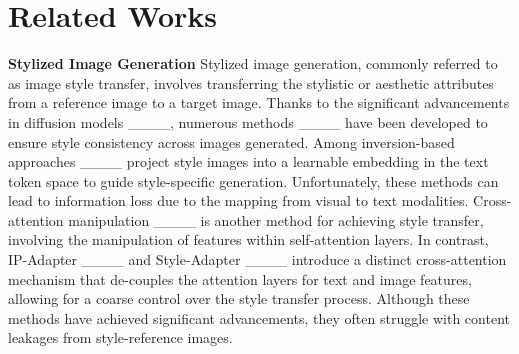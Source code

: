 \section{Related Works}
\textbf{Stylized Image Generation}
Stylized image generation, commonly referred to as image style transfer, involves transferring the stylistic or aesthetic attributes from a reference image to a target image. 
Thanks to the significant advancements in diffusion models ____,
numerous methods ____ have been developed to ensure style consistency across images generated. Among inversion-based approaches ____ project style images into a learnable embedding in the text token space to guide style-specific generation. Unfortunately, these methods can lead to information loss due to the mapping from visual to text modalities.
Cross-attention manipulation ____ is another method for achieving style transfer, involving the manipulation of features within self-attention layers. 
In contrast, IP-Adapter ____ and Style-Adapter ____ introduce a distinct cross-attention mechanism that de-couples the attention layers for text and image features, allowing for a coarse control over the style transfer process. 
Although these methods have achieved significant advancements, they often struggle with content leakages from style-reference images.


